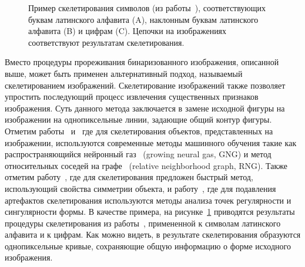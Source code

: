 \documentclass[a4paper,12pt,russian]{article} %
\begin{document}
\begin{figure}[t!]
	\caption{
		Пример скелетирования символов (из работы~\cite{fujita2015extract}), соответствующих буквам латинского алфавита (A), наклонным буквам латинского алфавита (B) и цифрам (C). Цепочки на изображениях соответствуют результатам скелетирования.
        }
        \label{fig:nn_skelets}
\end{figure}
  
Вместо процедуры прореживания бинаризованного изображения, описанной выше, может быть применен альтернативный подход, называемый скелетированием изображений.
Скелетирование изображений также позволяет упростить последующий процесс извлечения существенных признаков изображения.
Суть данного метода заключается в замене исходной фигуры на изображении на однопиксельные линии, задающие общий контур фигуры.
Отметим работы~\cite{supriana2014handwriting} и~\cite{fujita2015extract} где для скелетирования объектов, представленных на изображении, используются современные методы машинного обучения такие как распространяющийся нейронный газ~\cite{fritzke1995growing} (growing neural gas, GNG) и метод относительных соседей на графе~\cite{toussaint1980relative} (relative neighborhood graph, RNG).
Также отметим работу~\cite{zou2003fast}, где для скелетирования предложен быстрый метод, использующий свойства симметрии объекта, и работу~\cite{zou2001skeletonization}, где для подавления артефактов скелетирования используются методы анализа точек регулярности и сингулярности формы.
В качестве примера, на рисунке~\ref{fig:nn_skelets} приводятся результаты процедуры скелетирования из работы~\cite{fujita2015extract}, примененной к символам латинского алфавита и к цифрам.
Как можно видеть, в результате скелетирования образуются однопиксельные кривые, сохраняющие общую информацию о форме исходного изображения.
\end{document}
